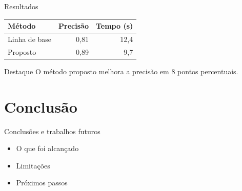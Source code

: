 \documentclass[aspectratio=169,10pt]{beamer}
\begin{document}
\begin{frame}{Resultados}
  \centering
  \begin{tabular}{lrr}
    \hline
    Método & Precisão & Tempo (s) \\ \hline
    Linha de base & 0,81 & 12,4 \\
    Proposto & 0,89 & 9,7 \\ \hline
  \end{tabular}
  \par\medskip
  \begin{exampleblock}{Destaque}
    O método proposto melhora a precisão em 8 pontos percentuais.
  \end{exampleblock}
\end{frame}

\section{Conclusão}

\begin{frame}{Conclusões e trabalhos futuros}
  \begin{itemize}
    \item O que foi alcançado
    \item Limitações
    \item Próximos passos
  \end{itemize}
\end{frame}

\end{document}
